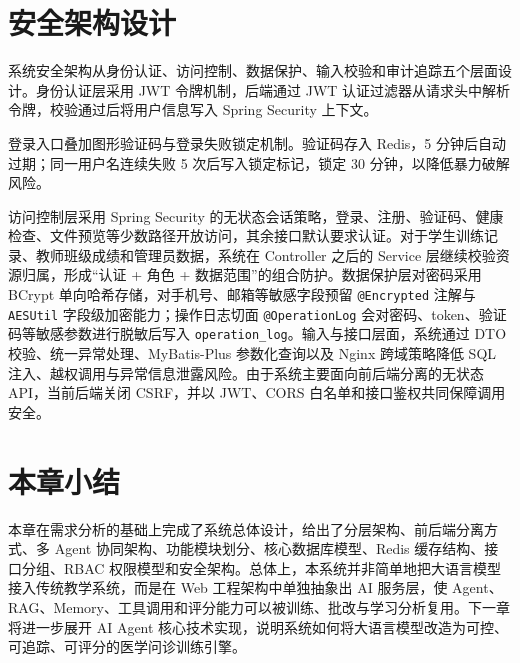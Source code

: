 \section{安全架构设计}
系统安全架构从身份认证、访问控制、数据保护、输入校验和审计追踪五个层面设计。身份认证层采用 JWT 令牌机制\cite{jones2015jwt}，后端通过 JWT 认证过滤器从请求头中解析令牌，校验通过后将用户信息写入 Spring Security 上下文。

登录入口叠加图形验证码与登录失败锁定机制。验证码存入 Redis，5 分钟后自动过期；同一用户名连续失败 5 次后写入锁定标记，锁定 30 分钟，以降低暴力破解风险。

访问控制层采用 Spring Security 的无状态会话策略，登录、注册、验证码、健康检查、文件预览等少数路径开放访问，其余接口默认要求认证。对于学生训练记录、教师班级成绩和管理员数据，系统在 Controller 之后的 Service 层继续校验资源归属，形成“认证 + 角色 + 数据范围”的组合防护。数据保护层对密码采用 BCrypt 单向哈希存储，对手机号、邮箱等敏感字段预留 \texttt{@Encrypted} 注解与 \texttt{AESUtil} 字段级加密能力；操作日志切面 \texttt{@OperationLog} 会对密码、token、验证码等敏感参数进行脱敏后写入 \texttt{operation\_log}。输入与接口层面，系统通过 DTO 校验、统一异常处理、MyBatis-Plus 参数化查询以及 Nginx 跨域策略降低 SQL 注入、越权调用与异常信息泄露风险。由于系统主要面向前后端分离的无状态 API，当前后端关闭 CSRF，并以 JWT、CORS 白名单和接口鉴权共同保障调用安全。

\section{本章小结}

本章在需求分析的基础上完成了系统总体设计，给出了分层架构、前后端分离方式、多 Agent 协同架构、功能模块划分、核心数据库模型、Redis 缓存结构、接口分组、RBAC 权限模型和安全架构。总体上，本系统并非简单地把大语言模型接入传统教学系统，而是在 Web 工程架构中单独抽象出 AI 服务层，使 Agent、RAG、Memory、工具调用和评分能力可以被训练、批改与学习分析复用。下一章将进一步展开 AI Agent 核心技术实现，说明系统如何将大语言模型改造为可控、可追踪、可评分的医学问诊训练引擎。
